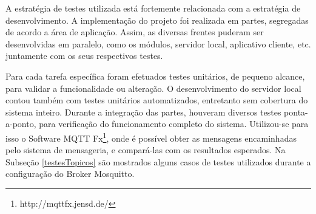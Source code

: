 A estratégia de testes utilizada está fortemente relacionada com a estratégia de desenvolvimento. A implementação do projeto foi realizada em partes, segregadas de acordo a área de aplicação. Assim, as diversas frentes puderam ser desenvolvidas em paralelo, como os módulos, servidor local, aplicativo cliente, etc. juntamente com os seus respectivos testes.

Para cada tarefa específica foram efetuados testes unitários, de pequeno alcance, para validar a funcionalidade ou alteração. O desenvolvimento do servidor local contou também com testes unitários automatizados, entretanto sem cobertura do sistema inteiro. Durante a integração das partes, houveram diversos testes ponta-a-ponto, para verificação do funcionamento completo do sistema. Utilizou-se para isso o Software MQTT Fx\footnote{http://mqttfx.jensd.de/}, onde é possível obter as mensagens encaminhadas pelo sistema de mensageria, e compará-las com os resultados esperados. Na Subseção \ref{testesTopicos} são mostrados alguns casos de testes utilizados durante a configuração do Broker Mosquitto.